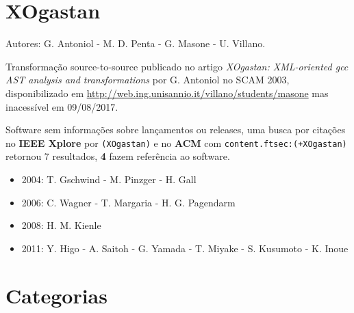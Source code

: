 \section{XOgastan}

Autores:
G. Antoniol - M. D. Penta - G. Masone - U. Villano.

Transformação source-to-source
publicado no artigo {\it XOgastan: XML-oriented gcc AST analysis and transformations}
por G. Antoniol
no SCAM 2003,
disponibilizado em \url{http://web.ing.unisannio.it/villano/students/masone}
mas inacessível em 09/08/2017.

Software sem informações sobre lançamentos ou releases,
uma busca por citações no {\bf IEEE Xplore} por
\texttt{(XOgastan)}
e no {\bf ACM} com
\texttt{content.ftsec:(+XOgastan)}
retornou
7 resultados,
{\bf 4} fazem referência ao software.

\begin{itemize}
\item 2004: T. Gschwind - M. Pinzger - H. Gall
\item 2006: C. Wagner - T. Margaria - H. G. Pagendarm
\item 2008: H. M. Kienle
\item 2011: Y. Higo - A. Saitoh - G. Yamada - T. Miyake - S. Kusumoto - K. Inoue
\end{itemize}


\section{Categorias}



